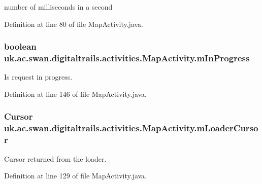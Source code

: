 number of milliseconds in a second 



Definition at line 80 of file Map\+Activity.\+java.

\hypertarget{classuk_1_1ac_1_1swan_1_1digitaltrails_1_1activities_1_1_map_activity_a006890d3a00d0e4b64a0b8603de4b6df}{
\subsubsection[{m\+In\+Progress}]{\setlength{\rightskip}{0pt plus 5cm}boolean uk.\+ac.\+swan.\+digitaltrails.\+activities.\+Map\+Activity.\+m\+In\+Progress\hspace{0.3cm}{\ttfamily [private]}}}\label{classuk_1_1ac_1_1swan_1_1digitaltrails_1_1activities_1_1_map_activity_a006890d3a00d0e4b64a0b8603de4b6df}


Is request in progress. 



Definition at line 146 of file Map\+Activity.\+java.

\hypertarget{classuk_1_1ac_1_1swan_1_1digitaltrails_1_1activities_1_1_map_activity_a31da11ed7d3bdcbe56d3be36c4dc8014}{
\subsubsection[{m\+Loader\+Cursor}]{\setlength{\rightskip}{0pt plus 5cm}Cursor uk.\+ac.\+swan.\+digitaltrails.\+activities.\+Map\+Activity.\+m\+Loader\+Cursor\hspace{0.3cm}{\ttfamily [private]}}}\label{classuk_1_1ac_1_1swan_1_1digitaltrails_1_1activities_1_1_map_activity_a31da11ed7d3bdcbe56d3be36c4dc8014}


Cursor returned from the loader. 



Definition at line 129 of file Map\+Activity.\+java.

